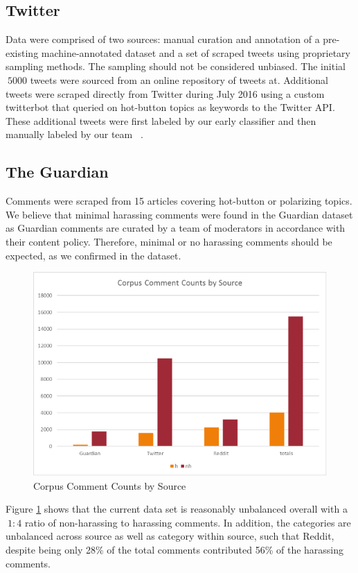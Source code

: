 \documentclass[11pt,a4paper]{article}
\begin{document}
\subsection{Twitter}
Data were comprised of two sources: manual curation
and annotation of a pre-existing machine-annotated
dataset and a set of scraped tweets using
proprietary sampling methods. The sampling
should not be considered unbiased. The initial
$~5000$ tweets were sourced from an online repository
of tweets at. Additional tweets were scraped
directly from Twitter during July 2016 using a custom
twitterbot that queried on hot-button topics as
keywords to the Twitter API. These additional
tweets were first labeled by our early classifier and
then manually labeled by our team ~\cite{Hart:2016}.

\subsection{The Guardian}
Comments were scraped from 15 articles covering
hot-button or polarizing topics. We believe that
minimal harassing comments were found in the
Guardian dataset as Guardian comments are curated
by a team of moderators in accordance with
their content policy. Therefore, minimal or no harassing
comments should be expected, as we confirmed
in the dataset.

\begin{figure}
  \includegraphics[width=\linewidth]{figure1_corpus_counts_by_source.png}
  \caption{Corpus Comment Counts by Source}
  \label{fig:corpus}
\end{figure}


Figure \ref{fig:corpus} shows that the current data set is reasonably unbalanced overall with a $~1:4$ ratio of non-harassing to harassing comments. In addition, the categories are unbalanced across source as well as category within source, such that Reddit, despite being only 28\% of the total comments contributed 56\% of the harassing comments.
\end{document}
